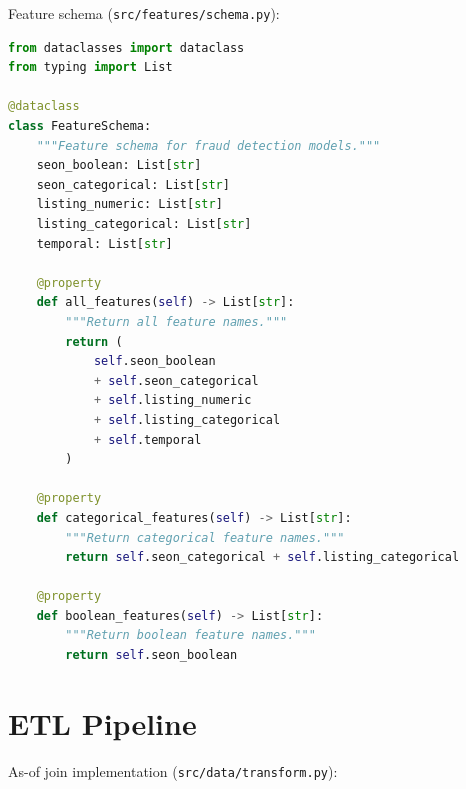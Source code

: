 Feature schema (\texttt{src/features/schema.py}):

\begin{lstlisting}[language=Python, basicstyle=\ttfamily\fontsize{8}{10}\selectfont]
from dataclasses import dataclass
from typing import List

@dataclass
class FeatureSchema:
    """Feature schema for fraud detection models."""
    seon_boolean: List[str]
    seon_categorical: List[str]
    listing_numeric: List[str]
    listing_categorical: List[str]
    temporal: List[str]

    @property
    def all_features(self) -> List[str]:
        """Return all feature names."""
        return (
            self.seon_boolean
            + self.seon_categorical
            + self.listing_numeric
            + self.listing_categorical
            + self.temporal
        )

    @property
    def categorical_features(self) -> List[str]:
        """Return categorical feature names."""
        return self.seon_categorical + self.listing_categorical

    @property
    def boolean_features(self) -> List[str]:
        """Return boolean feature names."""
        return self.seon_boolean
\end{lstlisting}

\section{ETL Pipeline}
\label{appendix:etl}

As-of join implementation (\texttt{src/data/transform.py}):

